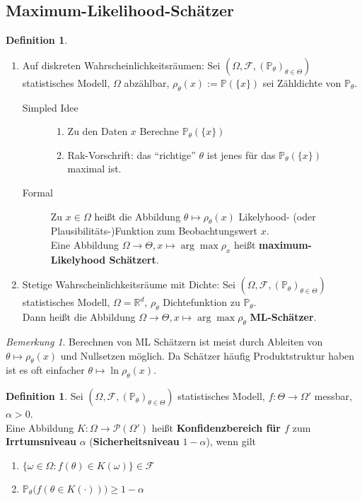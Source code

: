 \documentclass[10pt,a4paper]{article}
\newcommand{\R}{\ensuremath{\mathbb{R}}}
\newcommand{\al}{\ensuremath{\alpha}}
\newcommand{\potset}{\mathscr P}
\newcommand{\Prb}{\mathbb P}
\newcommand{\scF}{\ensuremath{\mathscr{F}}}
\theoremstyle{plain}
\theoremstyle{definition}
\newtheorem{definition}[theorem]{Definition}
\theoremstyle{remark}
\newtheorem{bem}[theorem]{Bemerkung}
\begin{document}
	\subsection{Maximum-Likelihood-Schätzer}
	\begin{definition}
		\begin{enumerate}
			\item Auf diskreten Wahrscheinlichkeitsräumen: Sei $(\Omega,\scF,(\Prb_\theta)_{\theta\in\Theta})$ statistisches Modell, $\Omega$ abzählbar, $\rho_{\theta}(x):=\Prb(\{x\})$ sei Zähldichte von $\Prb_\theta$.
			\begin{description}
				\item[Simpled Idee] \begin{enumerate}
					\item Zu den Daten $x$ Berechne $\Prb_\theta(\{x\})$
					\item Rak-Vorschrift: das \enquote{richtige} $\theta$ ist jenes für das $\Prb_\theta(\{x\})$ maximal ist.
				\end{enumerate}
				\item[Formal] Zu $x\in\Omega$ heißt die Abbildung $\theta\mapsto\rho_\theta(x)$ Likelyhood- (oder Plausibilitäts-)Funktion zum Beobachtungswert $x$.\\
				Eine Abbildung $\Omega\to\Theta,x\mapsto\arg\max\rho_x$ heißt \textbf{maximum-Likelyhood Schätzert}.
			\end{description}
		\item Stetige Wahrscheinlichkeitsräume mit Dichte: Sei $(\Omega,\scF,(\Prb_\theta)_{\theta\in\Theta})$ statistisches Modell, $\Omega=\R^d$, $\rho_\theta$ Dichtefunktion zu $\Prb_\theta$.\\
		Dann heißt die Abbildung $\Omega\to\Theta, x\mapsto\arg\max\rho_\theta$ \textbf{ML-Schätzer}.
		\end{enumerate}
	\end{definition}

	\begin{bem}
		Berechnen von ML Schätzern ist meist durch Ableiten von $\theta\mapsto\rho_\theta(x)$ und Nullsetzen möglich. Da Schätzer häufig Produktstruktur haben ist es oft einfacher $\theta\mapsto\ln\rho_\theta(x)$.
	\end{bem}

	\begin{definition}
		Sei $(\Omega,\scF,(\Prb_\theta)_{\theta\in\Theta})$ statistisches Modell, $f:\Theta\to\Omega'$ messbar, $\al>0$.\\
		Eine Abbildung $K:\Omega\to\potset(\Omega')$ heißt \textbf{Konfidenzbereich für $f$} zum \textbf{Irrtumsniveau} $\al$ (\textbf{Sicherheitsniveau} $1-\al$), wenn gilt
		\begin{enumerate}[label=(\roman*)]
			\item $\{\omega\in\Omega:f(\theta)\in K(\omega)\}\in\scF$
			\item $\Prb_\theta\big(f(\theta\in K(\cdot))\big)\geq 1-\al$
		\end{enumerate}
	\end{definition}
\end{document}
